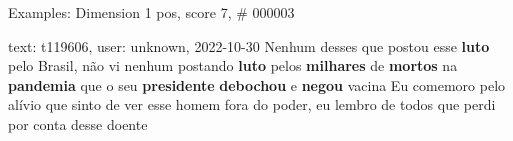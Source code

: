 \begin{frame}{Examples: Dimension 1 pos, score 7, \# 000003}
\footnotesize
\begin{exampleblock}{text: t119606, user: unknown, 2022-10-30}
Nenhum desses que postou esse \textbf{luto} pelo Brasil, não vi nenhum postando 
\textbf{luto} pelos \textbf{milhares} de \textbf{mortos} na \textbf{pandemia} 
que o seu \textbf{presidente} \textbf{debochou} e \textbf{negou} vacina Eu 
comemoro pelo alívio que sinto de ver esse homem fora do poder, eu lembro de 
todos que perdi por conta desse doente 
\end{exampleblock}
\end{frame}
